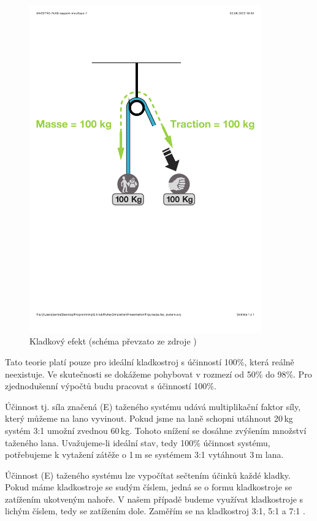\begin{figure}[!hbt]
    \centering
    \includegraphics[width=10.0cm]{Figures/PulleySystem/pulley_system.pdf}
    \caption[Kladkový efekt]{Kladkový efekt (schéma převzato ze zdroje \cite{Petzl_2022})}
    \label{Obr:pulley_system}
\end{figure} 

Tato teorie platí pouze pro ideální kladkostroj s účinností 100\%, která reálně neexistuje. Ve skutečnosti se dokážeme pohybovat v rozmezí od 50\% do 98\%. Pro zjednodušenní výpočtů budu pracovat s účinností 100\%.

Účinnost tj. síla značená (E) taženého systému udává multiplikační faktor síly, který můžeme na lano vyvinout. Pokud jsme na laně schopni utáhnout 20\,kg systém 3:1 umožní zvednou 60\,kg. Tohoto snížení se dosáhne zvýšením množství taženého lana. Uvažujeme-li ideální stav, tedy 100\% účinnost systému, potřebujeme k vytažení zátěže o 1\,m se systémem 3:1 vytáhnout 3\,m lana.

Účinnost (E) taženého systému lze vypočítat sečtením účinků každé kladky. Pokud máme kladkostroje se sudým číslem, jedná se o formu kladkostroje se zatížením ukotveným nahoře. V našem případě budeme využívat kladkostroje s lichým číslem, tedy se zatížením dole. Zaměřím se na kladkostroj 3:1, 5:1 a 7:1 \cite{Petzl_2022}.


